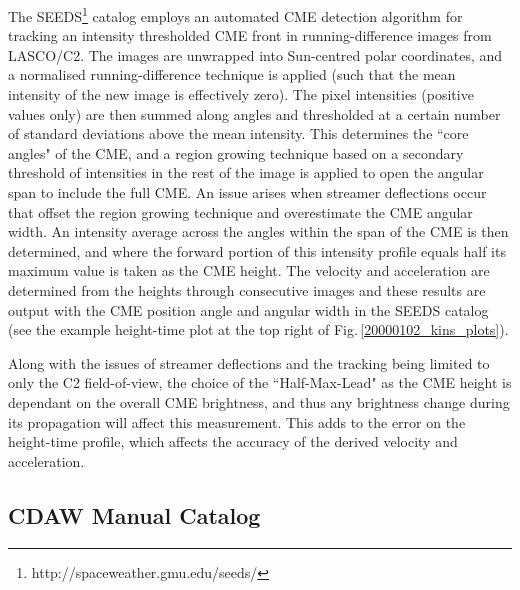 \documentclass[referee,a4paper,12pt,traditabstract]{swsc}
\begin{document}
\begin{linenumbers}
The SEEDS\footnote{http://spaceweather.gmu.edu/seeds/} catalog employs an automated CME detection algorithm for tracking an intensity thresholded CME front in running-difference images from LASCO/C2. The images are unwrapped into Sun-centred polar coordinates, and a normalised running-difference technique is applied (such that the mean intensity of the new image is effectively zero). The pixel intensities (positive values only) are then summed along angles and thresholded at a certain number of standard deviations above the mean intensity. This determines the ``core angles" of the CME, and a region growing technique based on a secondary threshold of intensities in the rest of the image is applied to open the angular span to include the full CME. An issue arises when streamer deflections occur that offset the region growing technique and overestimate the CME angular width. An intensity average across the angles within the span of the CME is then determined, and where the forward portion of this intensity profile equals half its maximum value is taken as the CME height. The velocity and acceleration are determined from the heights through consecutive images and these results are output with the CME position angle and angular width in the SEEDS catalog (see the example height-time plot at the top right of Fig.\,\ref{20000102_kins_plots}).

Along with the issues of streamer deflections and the tracking being limited to only the C2 field-of-view, the choice of the ``Half-Max-Lead" as the CME height is dependant on the overall CME brightness, and thus any brightness change during its propagation will affect this measurement. This adds to the error on the height-time profile, which affects the accuracy of the derived velocity and acceleration.

\subsection{CDAW Manual Catalog}


\end{linenumbers}
\end{document}
